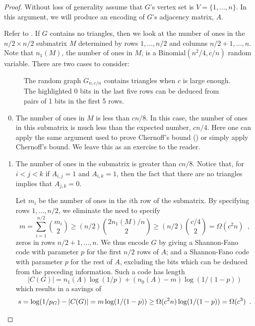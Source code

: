 \documentclass{patmorin}
\begin{document}
\begin{proof}
  Without loss of generality assume that $G$'s vertex set is
  $V=\{1,\ldots,n\}$.  In this argument, we will produce an encoding
  of $G$'s adjacency matrix, $A$.

  Refer to .  If $G$ contains no triangles, then we
  look at the number of ones in the $n/2\times n/2$ submatrix $M$
  determined by rows $1,\ldots,n/2$ and columns $n/2+1,\ldots,n$. Note that $n_1(M)$, the number of ones in $M$, is a $\mathrm{Binomial}(n^2/4, c/n)$ random variable.
  There are two cases to consider:
  
  \begin{figure}
    \caption{The random graph $G_{n,c/n}$ contains triangles when $c$
      is large enough.  The highlighted 0 bits in the last five rows
      can be deduced from pairs of 1 bits in the first 5 rows.}
  \end{figure}

  \begin{enumerate}\setcounter{enumi}{-1}
  \item The number of ones in $M$ is less than $cn/8$.  In
    this case, the number of ones in this submatrix is much less than
    the expected number, $cn/4$.  Here one can apply the same argument
    used to prove Chernoff's bound () or simply
    apply Chernoff's bound. We leave this as an exercise to the
    reader.

  \item The number of ones in the submatrix is greater than $cn/8$.
    Notice that, for $i<j<k$ if $A_{i,j}=1$ and $A_{i,k}=1$, then the
    fact that there are no triangles implies that $A_{j,k}=0$.

    Let $m_i$ be the number of ones in the $i$th row of the submatrix.
    By specifying rows $1,\ldots,n/2$, we eliminate the need to
    specify
    \[
    m = \sum_{i=1}^{n/2}\binom{m_i}{2} \ge (n/2) \binom{2 n_1(M)/n}{2} \ge (n/2)\binom{c/4}{2} =
    \Omega(c^2n) \enspace ,
    \]
    zeros in rows $n/2+1,\ldots,n$. We thus encode $G$ by giving a Shannon-Fano code with parameter $p$ for the first $n/2$ rows of $A$; and a Shannon-Fano code with parameter $p$ for the rest of $A$, excluding the bits which can be deduced from the preceding information. Such a code has length
    \[
    |C(G)| = n_1(A) \log(1/p) + (n_0(A)-m)\log(1/(1-p))
    \]
    which results in a savings of
    \[
    s = \log(1/p_G) - |C(G)| = m\log(1/(1-p)) \ge
    \Omega(c^2n)\log(1/(1-p)) = \Omega(c^3) \enspace . \qedhere
    \]
  \end{enumerate}
\end{proof}
\end{document}
